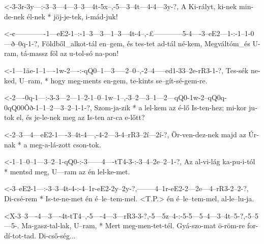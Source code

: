 

  {<-3-3r-3y---:-3--3---4---3--3---4t-5x--,-5---3--4t---4-4---3y-?,}
  {  A Ki-rályt, ki-nek min-de-nek él-nek * jöj-je-tek, i-mád-juk!}


  {<-¢-------------1---eE2-1--:-1--3---3---1--3---4t-4--,-£------------5-4----3--eE2---1-:-1--1-0---ð--0q-1-?,}
  {  Földből_alkot-tál en--gem, és tes-tet ad-tál né-kem, Megváltóm_és U-ram, tá-massz föl az u-tol-só na-pon!}

  {<-1---1äe-1--1----1w-2----:-qQ0--1---3-----2--0--,-2--4-----ed1-33--2e-rR3-1-?,}
  {  Tes-sék ne-ked, U--ram, * hogy meg-ments en-gem, te-kints se--gít-sé-gem-re.}

  {<-2----0q-1---:-3-3---2---1--2-1--0--1w--1--,-3--2---3--1---2---qQ0-1w-2--qQ0q-0qQ00Ôð-1--1--2---3--2--1-1-?,}
  {  Szom-ja-zik * a lel-kem az é-lő Is-ten-hez; mi-kor ju-tok el, és  je-le-nek  meg     az Is-ten ar-ca e-lőtt? }


  {<-2--3---4---eE2-1----3--4t-4---,-4-2---3-4--rR3--2í---2í-?,}
  {  Ör-ven-dez-nek majd az Úr-nak * a meg-a-lá-zott cson-tok.}

  {<-1--1--0--1---3--2--1-qQ0-:-3------4----tT4-3-:-3--4--2e--2--1-?,}
  {  Az al-vi-lág ka-pu-i-tól * mentsd meg, U---ram az én lel-ke-met.}

  {<-3--eE2-1---:-3--3--4t-4-:-4--1r-eE2-2y--2y-?,--------4--1r-eE2-2---2e---4--rR3-2--2-?,}
  {  Di-csé-rem * Is-te-ne-met én é--le--tem-mel.  <T.P.> én é--le--tem-mel, al-le--lu-ja.}

  {<X-3--3----4---3----4t-tT4--,-5----4---3---rR3-3-?,-5---5z--4-:-5-5---5--4---3--4t--5-?,-5--5---5-.}
  {   Ma-gasz-tal-lak, U--ram, * Mert meg-men-tet-tél. Gyá-szo-mat ö-röm-re for-dí-tot-tad. Di-cső-ség...}

